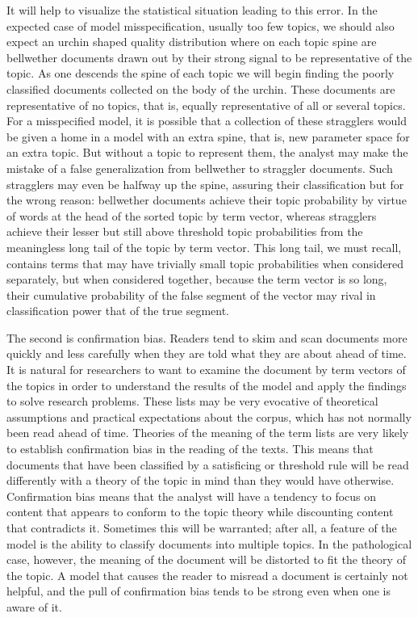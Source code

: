\documentclass[]{book}
\theoremstyle{definition}
\theoremstyle{definition}
\theoremstyle{definition}
\theoremstyle{remark}
\begin{document}
It will help to visualize the statistical situation leading to this
error. In the expected case of model misspecification, usually too few
topics, we should also expect an urchin shaped quality distribution
where on each topic spine are bellwether documents drawn out by their
strong signal to be representative of the topic. As one descends the
spine of each topic we will begin finding the poorly classified
documents collected on the body of the urchin. These documents are
representative of no topics, that is, equally representative of all or
several topics. For a misspecified model, it is possible that a
collection of these stragglers would be given a home in a model with an
extra spine, that is, new parameter space for an extra topic. But
without a topic to represent them, the analyst may make the mistake of a
false generalization from bellwether to straggler documents. Such
stragglers may even be halfway up the spine, assuring their
classification but for the wrong reason: bellwether documents achieve
their topic probability by virtue of words at the head of the sorted
topic by term vector, whereas stragglers achieve their lesser but still
above threshold topic probabilities from the meaningless long tail of
the topic by term vector. This long tail, we must recall, contains terms
that may have trivially small topic probabilities when considered
separately, but when considered together, because the term vector is so
long, their cumulative probability of the false segment of the vector
may rival in classification power that of the true segment.

The second is confirmation bias. Readers tend to skim and scan documents
more quickly and less carefully when they are told what they are about
ahead of time. It is natural for researchers to want to examine the
document by term vectors of the topics in order to understand the
results of the model and apply the findings to solve research problems.
These lists may be very evocative of theoretical assumptions and
practical expectations about the corpus, which has not normally been
read ahead of time. Theories of the meaning of the term lists are very
likely to establish confirmation bias in the reading of the texts. This
means that documents that have been classified by a satisficing or
threshold rule will be read differently with a theory of the topic in
mind than they would have otherwise. Confirmation bias means that the
analyst will have a tendency to focus on content that appears to conform
to the topic theory while discounting content that contradicts it.
Sometimes this will be warranted; after all, a feature of the model is
the ability to classify documents into multiple topics. In the
pathological case, however, the meaning of the document will be
distorted to fit the theory of the topic. A model that causes the reader
to misread a document is certainly not helpful, and the pull of
confirmation bias tends to be strong even when one is aware of it.
\end{document}
